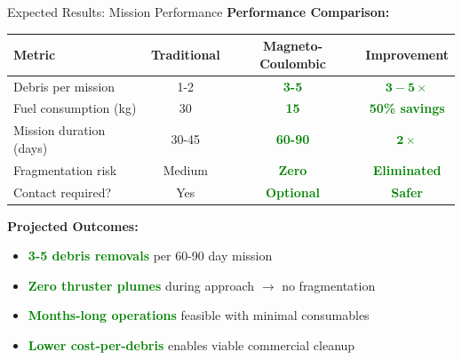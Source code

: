 \documentclass[aspectratio=169]{beamer}
\begin{document}
\begin{frame}{Expected Results: Mission Performance}
\textbf{Performance Comparison:}

\begin{center}
\begin{tabular}{lccc}
\toprule
\textbf{Metric} & \textbf{Traditional} & \textbf{Magneto-Coulombic} & \textbf{Improvement} \\
\midrule
Debris per mission & 1-2 & \textcolor{green}{\textbf{3-5}} & \textcolor{green}{$\mathbf{3-5\times}$} \\
Fuel consumption (kg) & 30 & \textcolor{green}{\textbf{15}} & \textcolor{green}{\textbf{50\% savings}} \\
Mission duration (days) & 30-45 & \textcolor{green}{\textbf{60-90}} & \textcolor{green}{$\mathbf{2\times}$} \\
Fragmentation risk & Medium & \textcolor{green}{\textbf{Zero}} & \textcolor{green}{\textbf{Eliminated}} \\
Contact required? & Yes & \textcolor{green}{\textbf{Optional}} & \textcolor{green}{\textbf{Safer}} \\
\bottomrule
\end{tabular}
\end{center}

\vspace{0.5cm}
\textbf{Projected Outcomes:}
\begin{itemize}
    \item \textcolor{green}{\textbf{3-5 debris removals}} per 60-90 day mission
    \item \textcolor{green}{\textbf{Zero thruster plumes}} during approach $\rightarrow$ no fragmentation
    \item \textcolor{green}{\textbf{Months-long operations}} feasible with minimal consumables
    \item \textcolor{green}{\textbf{Lower cost-per-debris}} enables viable commercial cleanup
\end{itemize}
\end{frame}
\end{document}
